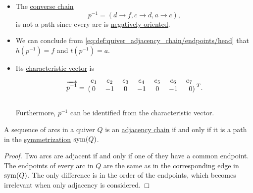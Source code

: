 \begin{example}
\begin{itemize}
    \item The \hyperref[def:quiver_adjacency_chain/converse]{converse chain}
    \begin{equation*}
      p^{-1} = (d \to f, c \to d, a \to c),
    \end{equation*}
    is not a path since every arc is \hyperref[def:quiver_adjacency_chain/orientation]{negatively oriented}.

    \item We can conclude from \eqref{eq:def:quiver_adjacency_chain/endpoints/head} that \( h(p^{-1}) = f \) and \( t(p^{-1}) = a \).

    \item Its \hyperref[def:quiver_directed_path/characteristic_vector]{characteristic vector} is
    \begin{equation*}
      \vect{p^{-1}}
      =
      \begin{blockarray}{ccccccrl}
        e_1 & e_2 & e_3 & e_4 & e_5 & e_6 & e_7 \\
      \begin{block}{(ccccccr)l}
        0   & -1  & 0   & -1  & 0   & -1  & 0   \\
      \end{block}
      \end{blockarray}
      {}^T.
    \end{equation*}

    Furthermore, \( p^{-1} \) can be identified from the characteristic vector.
  \end{itemize}
\end{example}

\begin{proposition}\label{thm:quiver_chain_symmetrization}
  A sequence of arcs in a quiver \( Q \) is an \hyperref[def:quiver_adjacency_chain]{adjacency chain} if and only if it is a path in the \hyperref[rem:undirected_graphs_as_directed]{symmetrization} \( \operatorname{sym}(Q) \).
\end{proposition}
\begin{proof}
  Two arcs are adjacent if and only if one of they have a common endpoint. The endpoints of every arc in \( Q \) are the same as in the corresponding edge in \( \operatorname{sym}(Q) \). The only difference is in the order of the endpoints, which becomes irrelevant when only adjacency is considered.
\end{proof}


